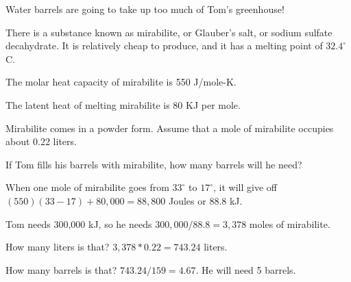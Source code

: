 \begin{Exercise}[title=Using Mirabilite For Thermal Energy Storage, label=mirabilite]

Water barrels are going to take up too much of Tom's greenhouse!

There is a substance known as mirabilite, or Glauber's salt,  or sodium sulfate decahydrate.  It is relatively cheap to produce, and it has a melting point of $32.4^\circ$ C.

The molar heat capacity of mirabilite is 550 J/mole-K.

The latent heat of melting mirabilite is 80 KJ per mole.

Mirabilite comes in a powder form.  Assume that a mole of mirabilite occupies about 0.22 liters.

If Tom fills his barrels with mirabilite,  how many barrels will he need?

\end{Exercise}
\begin{Answer}[ref=mirabilite] 

When one mole of mirabilite goes from $33^\circ$ to $17^\circ$,  it will give off $(550)(33-17) + 80,000 = 88,800$ Joules or $88.8$ kJ. 

Tom needs 300,000 kJ,  so he needs $300,000/88.8 =   3,378$ moles of mirabilite.

How many liters is that?  $3,378 * 0.22 = 743.24$ liters.

How many barrels is that? $743.24 / 159 = 4.67$.  He will need 5 barrels.
  
\end{Answer}



